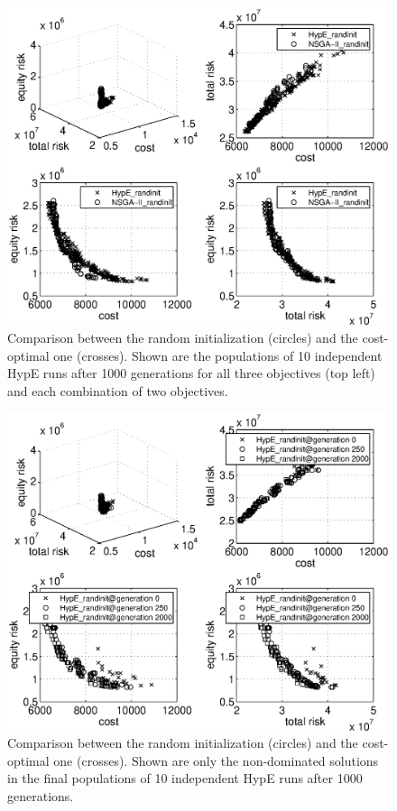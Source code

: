 \documentclass[preprint,12pt]{elsarticle}
\begin{document}
\begin{figure}%
	\includegraphics[width=\columnwidth]{../experiments/randVsCost/allsolutions.eps}%
	\caption{\label{fig:allsolutions} Comparison between the random initialization (circles) and the cost-optimal one (crosses). Shown are the populations of 10 independent HypE runs after 1000 generations for all three objectives (top left) and each combination of two objectives.}
\end{figure}

\begin{figure}%
	\includegraphics[width=\columnwidth]{../experiments/randVsCost/onlynondominated.eps}%
	\caption{\label{fig:onlynondominated} Comparison between the random initialization (circles) and the cost-optimal one (crosses). Shown are only the non-dominated solutions in the final populations of 10 independent HypE runs after 1000 generations.}
\end{figure}
\end{document}
